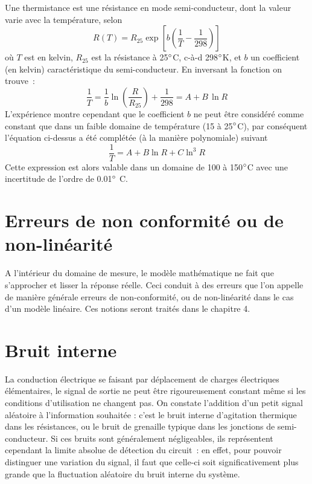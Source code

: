 Une thermistance est une résistance en mode semi-conducteur, dont la valeur varie avec la température, selon
\begin{equation}
R(T) = R_{25}\exp{\left[b\left(\frac{1}{T}-\frac{1}{298}\right)\right]}
\end{equation}
où $T$ est en kelvin, $R_{25}$ est la résistance à 25$\degree$C, c-à-d 298$\degree$K, et $b$ un coefficient (en kelvin) caractéristique du semi-conducteur. En inversant la fonction on trouve~:
\begin{equation}
\frac{1}{T} = \frac{1}{b}\ln{\left(\frac{R}{R_{25}}\right)}+\frac{1}{298} = A + B\,\ln{R}
\end{equation}
L'expérience montre cependant que le coefficient $b$ ne peut être considéré comme constant que dans un faible domaine de température (15 à 25$\degree$C), par conséquent l'équation ci-dessus a été complétée (à la manière polynomiale) suivant
\begin{equation}
\frac{1}{T} = A + B \ln{R} + C \ln^3{R}
\end{equation}
Cette expression est alors valable dans un domaine de 100 à 150$\degree$C avec une incertitude de l'ordre de 0.01$\degree$ C.

\section{Erreurs de non conformité ou de non-linéarité}

A l'intérieur du domaine de mesure, le modèle mathématique ne fait que s'approcher et lisser la réponse réelle. Ceci conduit à des erreurs que l'on appelle de manière générale erreurs de non-conformité, ou de non-linéarité dans le cas d'un modèle linéaire. Ces notions seront traités dans le chapitre 4.

\section{Bruit interne}

La conduction électrique se faisant par déplacement de charges électriques élémentaires, le signal de sortie ne peut être rigoureusement constant même si les conditions d'utilisation ne changent pas. On constate l'addition d'un petit signal aléatoire à l'information souhaitée : c'est le bruit interne d'agitation thermique dans les résistances, ou le bruit de grenaille typique dans les jonctions de semi-conducteur. Si ces bruits sont généralement négligeables, ils représentent cependant la limite absolue de détection du circuit~: en effet, pour pouvoir distinguer une variation du signal, il faut que celle-ci soit significativement plus grande que la fluctuation aléatoire du bruit interne du système.

